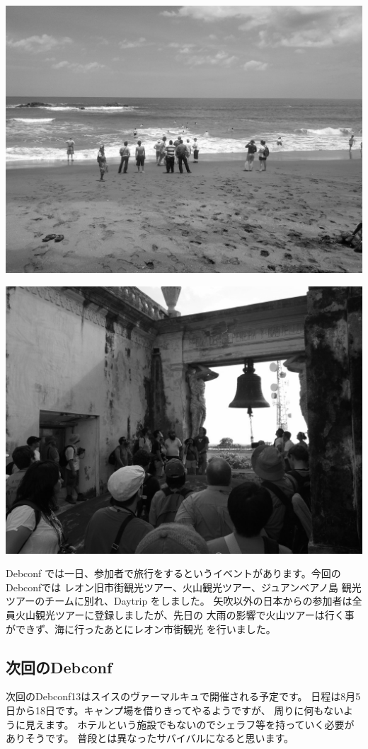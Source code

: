 \documentclass[mingoth,a4paper]{jsarticle}
\begin{document}
\begin{minipage}{0.4\hsize}
\includegraphics[width=0.8\hsize]{image201208/debconf12_daytrip01_mono.jpg}
\end{minipage}
\begin{minipage}{0.4\hsize}
\includegraphics[width=0.8\hsize]{image201208/debconf12_daytrip03_mono.jpg}
\end{minipage}

Debconf では一日、参加者で旅行をするというイベントがあります。今回の
Debconfでは レオン旧市街観光ツアー、火山観光ツアー、ジュアンベアノ島
観光ツアーのチームに別れ、Daytrip をしました。
矢吹以外の日本からの参加者は全員火山観光ツアーに登録しましたが、先日の
大雨の影響で火山ツアーは行く事ができず、海に行ったあとにレオン市街観光
を行いました。

\subsection{次回のDebconf}
次回のDebconf13はスイスのヴァーマルキュで開催される予定です。
日程は8月5日から18日です。キャンプ場を借りきってやるようですが、
周りに何もないように見えます。
ホテルという施設でもないのでシェラフ等を持っていく必要がありそうです。
普段とは異なったサバイバルになると思います。
\end{document}
